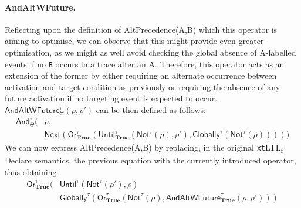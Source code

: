 \documentclass[sigconf]{acmart}
\begin{document}
\paragraph{AndAltWFuture.} Reflecting upon the definition of \textsf{AltPrecedence\-(A,B)} which this operator is aiming to optimise, we can observe that this might provide even greater optimisation, as we might as well avoid checking the global absence of \textsf{A}-labelled events if no \texttt{B} occurs in a trace after an \textsf{A}. Therefore, this operator acts as an extension of the former by either requiring an alternate occurrence between activation and target condition as previously or requiring the absence of any future activation if no targeting event is expected to occur. $\textsf{AndAltWFuture}^\tau_\Theta(\rho,\rho')$ can be then defined as follows:
\begin{equation}\label{AAW}
\begin{split}
\textsf{And}^\tau_\Theta(&\rho,\\
&\textsf{Next}(\textsf{Or}^\tau_\textbf{True}(\textsf{Until}^\tau_\textbf{True}(\textsf{Not}^\tau(\rho),\rho'),\textsf{Globally}^\tau(\textsf{Not}^\tau(\rho)))))
\end{split}
\end{equation}
We can now express \textsf{AltPrecedence(A,B)} by replacing, in the original \texttt{xt}LTL\textsubscript{f} Declare semantics, the previous equation with the currently introduced operator, thus obtaining:
\begin{equation}\label{qp2}
    \begin{split}
\textsf{Or}^\tau_{\textbf{True}}(&\textsf{Until}^\tau(\textsf{Not}^\tau(\rho'),\rho)\\
&\textsf{Globally}^\tau(\textsf{Or}^\tau_\textbf{True}(\textsf{Not}^\tau(\rho),\textsf{AndAltWFuture}^{\tau}_{\textbf{True}}(\rho,\rho')))\\
\end{split}
\end{equation}
\medskip
\end{document}
